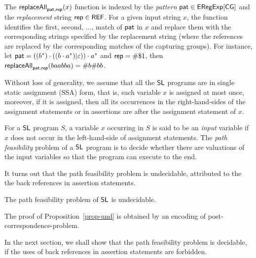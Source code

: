 The $\mathsf{replaceAll}_{\mathsf{pat}, \mathsf{rep}}(x)$ function is indexed by the  %
\emph{pattern} $\mathsf{pat} \in {\sf ERegExp}[\sf CG]$ and the \emph{replacement} string $\mathsf{rep} \in {\sf REF}$. For a given input string $x$, the function identifies the first, second, $\dots$, match of $\mathsf{pat}$ in $x$ and replace them with the corresponding strings specified by the replacement string (where the references are replaced by the corresponding matches of the capturing groups).  For instance, let $\mathsf{pat} = ((b^\ast) \cdot ((b \cdot a^\ast) | \varepsilon)) \cdot a^\ast$ and $\mathsf{rep} = \#\$1$, then  $\mathsf{replaceAll}_{\mathsf{pat}, \mathsf{rep}}(baabba) = \#b\#bb$. 

Without loss of generality, we assume that all the $\mathsf{SL}$ programs are in single static assignment (SSA) form, that is, each variable $x$ is assigned at most once, moreover, if it is assigned, then all its occurrences in the right-hand-sides of the assignment statements or in assertions are after the assignment statement of $x$.

For a $\mathsf{SL}$ program $S$, a variable $x$ occurring in $S$ is said to be an \emph{input} variable if $x$ does not occur in the left-hand-side of assignment statements. 
The \emph{path feasibility} problem of a $\mathsf{SL}$ program is to decide whether there are valuations of the input variables so that the program can execute to the end.


%





It turns out that the path feasibility problem is undecidable, attributed to the the back references in assertion statements. 

\begin{proposition}\label{prop-und}
The path feasibility problem of $\mathsf{SL}$ is undecidable.
\end{proposition}

The proof of Proposition~\ref{prop-und} is obtained by an encoding of post-correspondence-problem. 

In the next section, we shall show that the path feasibility problem is decidable, if the uses of back references in assertion statements are forbidden. 
